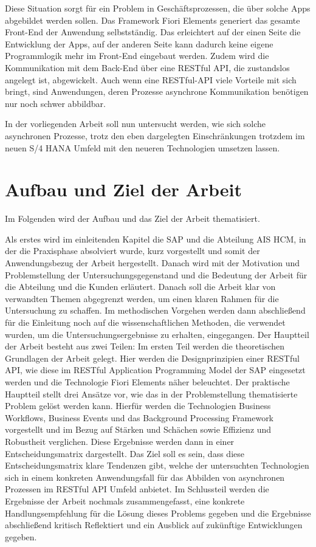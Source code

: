 Diese Situation sorgt für ein Problem in Geschäftsprozessen, die über solche Apps abgebildet werden sollen. Das Framework Fiori Elements generiert das gesamte Front-End der Anwendung selbstständig. Das erleichtert auf der einen Seite die Entwicklung der Apps, auf der anderen Seite kann dadurch keine eigene Programmlogik mehr im Front-End eingebaut werden. Zudem wird die Kommunikation mit dem Back-End über eine RESTful API, die zustandslos angelegt ist, abgewickelt. Auch wenn eine RESTful-API viele Vorteile mit sich bringt, sind Anwendungen, deren Prozesse asynchrone Kommunikation benötigen nur noch schwer abbildbar.

In der vorliegenden Arbeit soll nun untersucht werden, wie sich solche asynchronen Prozesse, trotz den eben dargelegten Einschränkungen trotzdem im neuen S/4 HANA Umfeld mit den neueren Technologien umsetzen lassen.

\section{Aufbau und Ziel der Arbeit}

Im Folgenden wird der Aufbau und das Ziel der Arbeit thematisiert.

Als erstes wird im einleitenden Kapitel die SAP und die Abteilung AIS HCM, in der die Praxisphase absolviert wurde, kurz vorgestellt und somit der Anwendungsbezug der Arbeit hergestellt. Danach wird mit der Motivation und Problemstellung der Untersuchungsgegenstand und die Bedeutung der Arbeit für die Abteilung und die Kunden erläutert. Danach soll die Arbeit klar von verwandten Themen abgegrenzt werden, um einen klaren Rahmen für die Untersuchung zu schaffen. Im methodischen Vorgehen werden dann abschlie{\ss}end für die Einleitung noch auf die wissenschaftlichen Methoden, die verwendet wurden, um die Untersuchungsergebnisse zu erhalten, eingegangen. Der Hauptteil der Arbeit besteht aus zwei Teilen: Im ersten Teil werden die theoretischen Grundlagen der Arbeit gelegt. Hier werden die Designprinzipien einer RESTful API, wie diese im RESTful Application Programming Model der SAP eingesetzt werden und die Technologie Fiori Elements näher beleuchtet. Der praktische Hauptteil stellt drei Ansätze vor, wie das in der Problemstellung thematisierte Problem gelöst werden kann. Hierfür werden die Technologien Business Workflows, Business Events und das Background Processing Framework vorgestellt und im Bezug auf Stärken und Schächen sowie Effizienz und Robustheit verglichen. Diese Ergebnisse werden dann in einer Entscheidungsmatrix dargestellt. Das Ziel soll es sein, dass diese Entscheidungsmatrix klare Tendenzen gibt, welche der untersuchten Technologien sich in einem konkreten Anwendungsfall für das Abbilden von asynchronen Prozessen im RESTful API Umfeld anbietet. Im Schlussteil werden die Ergebnisse der Arbeit nochmals zusammengefasst, eine konkrete Handlungsempfehlung für die Lösung dieses Problems gegeben und die Ergebnisse abschlie{\ss}end kritisch Reflektiert und ein Ausblick auf zukünftige Entwicklungen gegeben.


